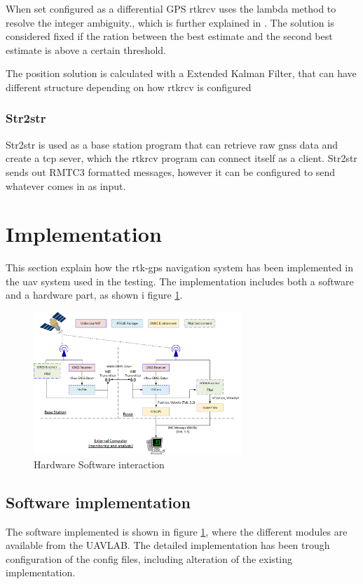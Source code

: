When set configured as a differential GPS rtkrcv uses the \gls{lambda} method to resolve the integer ambiguity., which is further explained in \citep{LAMBDAMETHOD}. The solution is considered fixed if the ration between the best estimate and the second best estimate is above a certain threshold.

The position solution is calculated with a Extended Kalman Filter, that can have different structure depending on how rtkrcv is configured
\subsubsection{Str2str}
Str2str is used as a base station program that can retrieve raw \gls{gnss} data and create a tcp sever, which the rtkrcv program can connect itself as a client. Str2str sends out RMTC3 formatted messages, however it can be configured to send whatever comes in as input.
\section{Implementation}
This section explain how the \gls{rtk-gps} navigation system has been implemented in the \gls{uav} system used in the testing. The implementation includes both a software and a hardware part, as shown i figure \ref{figure:HardSoft}.

\begin{figure}[H]
	\centering
		\includegraphics[width=0.7\textwidth]{figs/Combined.png}
		\caption{Hardware Software interaction}
		\label{figure:HardSoft}
\end{figure}
\subsection{Software implementation}
The software implemented is shown in figure \ref{figure:HardSoft}, where the different modules are available from the UAVLAB. The detailed implementation has been trough configuration of the config files, including alteration of the existing implementation.
